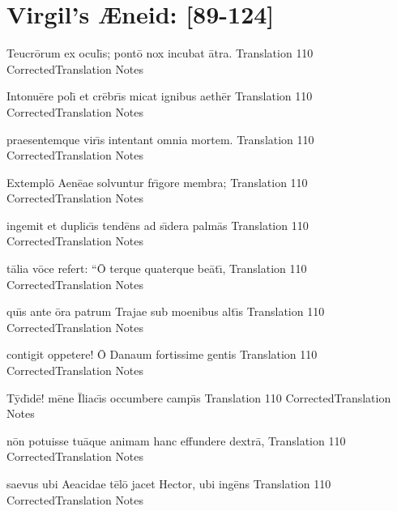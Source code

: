 \documentclass[]{article}
\begin{document}
\section*{Virgil's {\AE}neid:  [89-124]} %


\latline
  {Teucr\={\macron o}rum ex ocul\={\macron \i}s; pont\={\macron o} nox incubat \={\macron a}tra.}
  { Translation }
  {110}
  { CorrectedTranslation }
  { Notes }


\latline
  {Intonu\={\macron e}re pol\={\macron \i} et cr\={\macron e}br\={\macron \i}s micat ignibus aeth\={\macron e}r}
  { Translation }
  {110}
  { CorrectedTranslation }
  { Notes }


\latline
  {praesentemque vir\={\macron \i}s intentant omnia mortem.}
  { Translation }
  {110}
  { CorrectedTranslation }
  { Notes }


\newpage

\latline
  {Extempl\={\macron o} Aen\={\macron e}ae solvuntur fr\={\macron \i}gore membra;}
  { Translation }
  {110}
  { CorrectedTranslation }
  { Notes }


\latline
  {ingemit et duplic\={\macron \i}s tend\={\macron e}ns ad s\={\macron \i}dera palm\={\macron a}s}
  { Translation }
  {110}
  { CorrectedTranslation }
  { Notes }


\latline
  {t\={\macron a}lia v\={\macron o}ce refert:  ``\={\macron O} terque quaterque be\={\macron a}t\={\macron \i},}
  { Translation }
  {110}
  { CorrectedTranslation }
  { Notes }


\newpage

\latline
  {qu\={\macron \i}s ante \={\macron o}ra patrum Trajae sub moenibus alt\={\macron \i}s}
  { Translation }
  {110}
  { CorrectedTranslation }
  { Notes }


\latline
  {contigit oppetere!  \={\macron O} Danaum fortissime gentis}
  { Translation }
  {110}
  { CorrectedTranslation }
  { Notes }


\latline
  {T\={\macron y}d\={\macron \i}d\={\macron e}!  m\={\macron e}ne \={\macron I}liac\={\macron \i}s occumbere camp\={\macron \i}s}
  { Translation }
  {110}
  { CorrectedTranslation }
  { Notes }


\newpage

\latline
  {n\={\macron o}n potuisse tu\={\macron a}que animam hanc effundere dextr\={\macron a},}
  { Translation }
  {110}
  { CorrectedTranslation }
  { Notes }


\latline
  {saevus ubi Aeacidae t\={\macron e}l\={\macron o} jacet Hector, ubi ing\={\macron e}ns}
  { Translation }
  {110}
  { CorrectedTranslation }
  { Notes }
\end{document}
